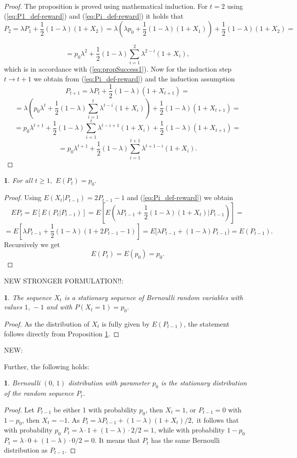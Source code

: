 \documentclass{amsart}
\theoremstyle{definition}
\theoremstyle{plain}
\newtheorem{prop}[thm]{\protect\propositionname}
\theoremstyle{plain}
\theoremstyle{plain}
\numberwithin{equation}{section}
\providecommand{\propositionname}{Proposition}
\begin{document}
\begin{proof}
The proposition is proved using mathematical induction. For $t=2$ using (\ref{eq:P1_def-reward})
and (\ref{eq:Pi_def-reward}) it holds that
\[
P_{2}=\lambda P_{1}+\frac{1}{2}(1-\lambda)(1+X_{2})=\lambda(\lambda p_{0}+\frac{1}{2}(1-\lambda)(1+X_{1}))+\frac{1}{2}(1-\lambda)(1+X_{2})=
\]

\[
=p_{0}\lambda^{2}+\frac{1}{2}(1-\lambda)\sum_{i=1}^{2}\lambda^{2-i}(1+X_{i}),
\]
which is in accordance with (\ref{eq:propSuccess1}). Now for the
induction step $t\rightarrow t+1$ we obtain from (\ref{eq:Pi_def-reward})
and the induction assumption
\[
P_{t+1}=\lambda P_{t}+\frac{1}{2}(1-\lambda)(1+X_{t+1})=
\]
\[
=\lambda(p_{0}\lambda^{t}+\frac{1}{2}(1-\lambda)\sum_{i=1}^{t}\lambda^{t-i}(1+X_{i}))+\frac{1}{2}(1-\lambda)(1+X_{t+1})=
\]
\[
=p_{0}\lambda^{t+1}+\frac{1}{2}(1-\lambda)\sum_{i=1}^{t}\lambda^{t-i+1}(1+X_{i})+\frac{1}{2}(1-\lambda)(1+X_{t+1})=
\]
\[
=p_{0}\lambda^{t+1}+\frac{1}{2}(1-\lambda)\sum_{i=1}^{t+1}\lambda^{t+1-i}(1+X_{i}).
\]
\end{proof}

\begin{prop}
\label{PropReward2}For all $t\geq1,$ $E(P_{t})=p_{0}.$
\end{prop}
\begin{proof}
Using $E(X_{t}|P_{t-1})=2P_{t-1}-1$ and (\ref{eq:Pi_def-reward})
we obtain
\[
EP_{t}=E[E(P_{t}|P_{t-1})]=E[E(\lambda P_{t-1}+\frac{1}{2}(1-\lambda)(1+X_{t})|P_{t-1})]=
\]
\[
=E[\lambda P_{t-1}+\frac{1}{2}(1-\lambda)(1+2P_{t-1}-1)]=E[\lambda P_{t-1}+(1-\lambda)P_{t-1})=  E(P_{t-1}).
\]
Recursively we get
\begin{equation}
E(P_{t})=E(p_{0})=p_{0}.\label{eq:EPt-reward-formula}
\end{equation}
\end{proof}

NEW STRONGER FORMULATION!!:

\begin{prop}
The sequence $X_t$ is a stationary sequence of Bernoulli random
variables with values $1,\,-1$ and with $P(X_t=1)=p_0$.
\end{prop}
\begin{proof}
As the distribution of $X_t$ is fully given by $E(P_{t-1})$, the
statement follows directly from Proposition \ref{PropReward2}.
\end{proof}

NEW:

Further, the following holds:

\begin{prop}
Bernoulli $(0,\,1)$ distribution with parameter $p_0$ is the stationary distribution of the random sequence
$P_t$.
\end{prop}
\begin{proof}
Let $P_{t-1}$ be either 1 with probability $p_0$, then $X_t=1$, or
$P_{t-1}=0$ with $1-p_0$, then $X_t=-1$.  As $P_t=\lambda
P_{t-1}+(1-\lambda)(1+X_t)/2,$ it follows that with probability
$p_0$ $P_t=\lambda\cdot 1+(1-\lambda)\cdot 2/2=1$, while with
probability $1-p_0$ $P_t=\lambda\cdot 0+(1-\lambda)\cdot 0/2=0$.
It means that $P_t$ has the same Bernoulli distribution as
$P_{t-1}$.
\end{proof}
\end{document}
